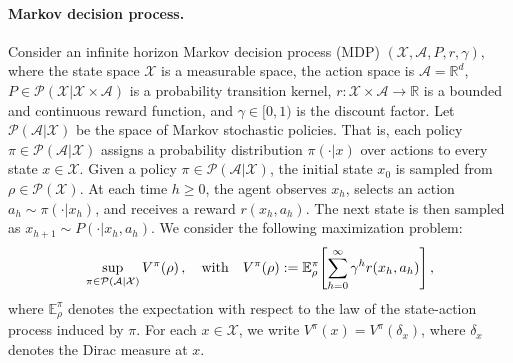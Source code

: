 \documentclass{article}
\newcommand{\1}{\mathbbm{1}}
\numberwithin{equation}{section}
\def\to{\rightarrow}
\def\sR{{\mathbb R}}
\begin{document}
\paragraph{Markov decision process.}
Consider an infinite horizon Markov decision process (MDP) $(\mathcal X,\mathcal A, P,r, \gamma)$,
where 
 the state space
$\mathcal X$ is a measurable space, 
the action space is 
$\mathcal A=\sR^d$,
$P \in   \mathcal P(\mathcal X|\mathcal X\times \mathcal A)$ is a probability transition kernel, 
$r:\mathcal X\times \mathcal A\to \mathbb R$
is a bounded and continuous
reward function, and 
$\gamma\in [0,1)$ is the discount factor.
Let $\mathcal P(\mathcal A|\mathcal X)$
be the space of Markov stochastic policies. {That is, each policy \(\pi\in\mathcal P(\mathcal A|\mathcal X)\) assigns a probability distribution
\(\pi(\cdot|x)\) over actions to every state \(x\in\mathcal X\).}
Given a policy $\pi \in \mathcal P(\mathcal A|\mathcal X)$, the initial state $x_0$
is sampled from  $\rho \in \mathcal P(\mathcal X)$.
At each time $h\ge 0$,
the agent observes $x_h$, selects an action $a_h\sim \pi(\cdot|x_h)$, and receives a reward $r(x_h, a_h)$. The next   state is then sampled as 
$x_{h+1}\sim P(\cdot|x_h, a_h)$. 
We consider the following maximization problem: 
\begin{equation}\label{eq:value-function-mdp}
\sup_{\pi\in \mathcal{P}(\mathcal A|\mathcal X)}V^\pi(\rho)\,,
\quad 
\textnormal{with}
\quad 
V^\pi(\rho)
:=
\mathbb E_\rho^\pi\!\left[
\sum_{h=0}^\infty \gamma^h r(x_h,a_h)
\right],
\end{equation}
where 
$\mathbb E_\rho^\pi$
denotes the expectation with respect to the law of the state-action process induced by $\pi$. 
For each $x\in \mathcal X$, 
we write $V^\pi(x)=V^\pi(\delta_x)$, where  $\delta_x$  denotes the Dirac measure at $x$. 


\end{document}
